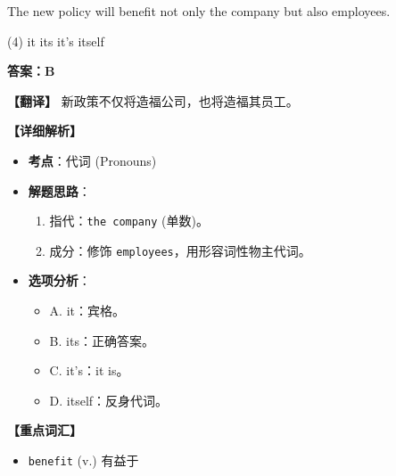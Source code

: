 \documentclass[11pt, a4paper]{article}
\newcommand{\analysis}[4]{
    \begin{solutionbox}
        \textbf{答案：#1}
        
        \textbf{【翻译】} #2
        
        \textbf{【详细解析】}
        #3
        
        \textbf{【重点词汇】}
        #4
    \end{solutionbox}
}
\newcommand{\blank}{\underline{\hspace{1.5cm}}}
\begin{document}
\begin{questions}
    \item The new policy will benefit not only the company but also \blank employees.
    \begin{tasks}(4)
        \task it \task its \task it's \task itself
    \end{tasks}
    \analysis{B}{新政策不仅将造福公司，也将造福其员工。}{
        \begin{itemize}
            \item \textbf{考点}：代词 (Pronouns)
            \item \textbf{解题思路}：
                \begin{enumerate}
                    \item 指代：\texttt{the company} (单数)。
                    \item 成分：修饰 \texttt{employees}，用形容词性物主代词。
                \end{enumerate}
            \item \textbf{选项分析}：
                \begin{itemize}
                    \item A. it：宾格。
                    \item B. its：正确答案。
                    \item C. it's：it is。
                    \item D. itself：反身代词。
                \end{itemize}
        \end{itemize}
    }{
        \begin{itemize}
            \item \texttt{benefit} (v.) 有益于
        \end{itemize}
    }


\end{questions}
\end{document}

